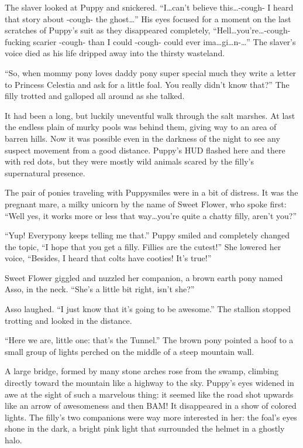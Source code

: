 The slaver looked at Puppy and snickered. ``I\dots can't believe this\dots -cough- I heard that story about -cough- the ghost\dots'' His eyes focused for a moment on the last scratches of Puppy's suit as they disappeared completely, ``Hell\dots you're\dots -cough- fucking scarier -cough- than I could -cough- could ever ima\dots gi\dots n-\dots'' The slaver's voice died as his life dripped away into the thirsty wasteland.

\horizonline


``So, when mommy pony loves daddy pony super special much they write a letter to Princess Celestia and ask for a little foal. You really didn't know that?'' The filly trotted and galloped all around as she talked.

It had been a long, but luckily uneventful walk through the salt marshes. At last the endless plain of murky pools was behind them, giving way to an area of barren hills. Now it was possible even in the darkness of the night to see any suspect movement from a good distance. Puppy's HUD flashed here and there with red dots, but they were mostly wild animals scared by the filly's supernatural presence.

The pair of ponies traveling with Puppysmiles were in a bit of distress. It was the pregnant mare, a milky unicorn by the name of Sweet Flower, who spoke first: ``Well yes, it works more or less that way\dots you're quite a chatty filly, aren't you?''

``Yup! Everypony keeps telling me that.'' Puppy smiled and completely changed the topic, ``I hope that you get a filly. Fillies are the cutest!'' She lowered her voice, ``Besides, I heard that colts have cooties! It's true!''

Sweet Flower giggled and nuzzled her companion, a brown earth pony named Asso, in the neck. ``She's a little bit right, isn't she?''

Asso laughed. ``I just know that it's going to be awesome.'' The stallion stopped trotting and looked in the distance.

``Here we are, little one: that's the Tunnel.'' The brown pony pointed a hoof to a small group of lights perched on the middle of a steep mountain wall.

A large bridge, formed by many stone arches rose from the swamp, climbing directly toward the mountain like a highway to the sky. Puppy's eyes widened in awe at the sight of such a marvelous thing: it seemed like the road shot upwards like an arrow of awesomeness and then BAM! It disappeared in a show of colored lights. The filly's two companions were way more interested in her: the foal's eyes shone in the dark, a bright pink light that surrounded the helmet in a ghostly halo.

